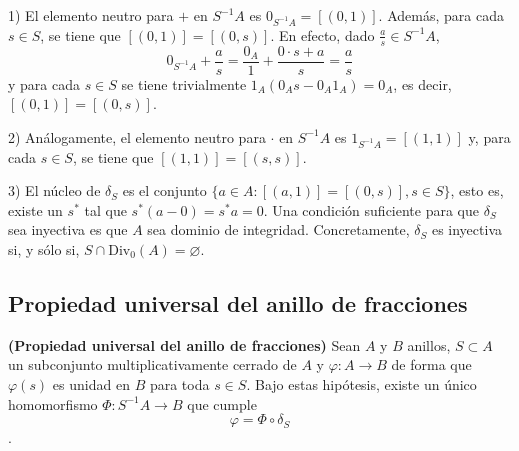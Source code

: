 \documentclass[../main.tex]{subfiles}
\begin{document}
\begin{remark}\label{iny} 
1) El elemento neutro para $+$ en $S^{-1}A$ es $0_{S^{-1}A}=[(0,1)]$. Además, para cada $s\in S$, se tiene que $[(0,1)]=[(0,s)]$. En efecto, dado $\frac{a}{s}\in S^{-1}A$, $$0_{S^{-1}A}+\frac{a}{s}=\frac{0_A}{1}+\frac{0\cdot s+a}{s}=\frac{a}{s}$$
y para cada $s\in S$ se tiene trivialmente $1_A(0_As-0_A1_A)=0_A$, es decir, $[(0,1)]=[(0,s)]$.

2) Análogamente, el elemento neutro para $·$ en $S^{-1}A$ es $1_{S^{-1}A}=[(1,1)]$ y, para cada $s\in S$, se tiene que $[(1,1)]=[(s,s)]$.

3) El núcleo de $\delta_S$ es el conjunto $\{a\in A:[(a,1)]=[(0,s)], s\in S\}$, esto es, existe un $s^{\ast}$ tal que $s^{\ast}(a-0)=s^{\ast}a=0$. Una condición suficiente para que $\delta_S$ sea inyectiva es que $A$ sea dominio de integridad. Concretamente, $\delta_S$ es inyectiva si, y sólo si, $S\cap\operatorname{Div_0}(A)=\varnothing$.
\end{remark}

\subsection{Propiedad universal del anillo de fracciones}
\begin{theorem}\textbf{(Propiedad universal del anillo de fracciones)} Sean $A$ y $B$ anillos, $S\subset A$ un subconjunto multiplicativamente cerrado de $A$ y $\varphi:A\longrightarrow B$ de forma que $\varphi(s)$ es unidad en $B$ para toda $s\in S$. Bajo estas hipótesis, existe un único homomorfismo $\Phi:S^{-1}A\longrightarrow B$ que cumple
$$\varphi=\Phi\circ\delta_S$$.
\end{theorem}
\end{document}
